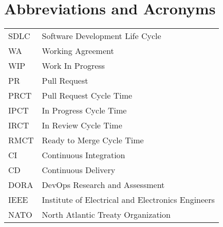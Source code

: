 \chapter*{Abbreviations and Acronyms}

\noindent
\begin{longtable}{@{}p{}p{}@{}}
SDLC & Software Development Life Cycle \\
WA & Working Agreement \\
WIP & Work In Progress \\
PR & Pull Request \\
PRCT & Pull Request Cycle Time \\
IPCT & In Progress Cycle Time \\
IRCT & In Review Cycle Time \\
RMCT & Ready to Merge Cycle Time \\
CI & Continuous Integration \\
CD & Continuous Delivery \\
DORA & DevOps Research and Assessment \\
IEEE & Institute of Electrical and Electronics Engineers \\
NATO & North Atlantic Treaty Organization \\

\end{longtable}